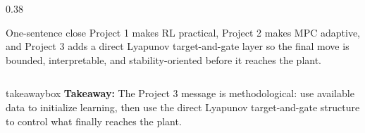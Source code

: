 \documentclass[aspectratio=169]{beamer}
\newcommand{\takeawaybox}[1]{%
\vspace{0.01cm}
\begin{center}
\begin{beamercolorbox}[wd=0.94\textwidth,sep=3pt,center,rounded=true,shadow=false]{takeawaybox}
\scriptsize
\textbf{\textcolor{maroon1}{Takeaway:}} #1
\end{beamercolorbox}
\end{center}
}
\begin{document}
\begin{frame}
\begin{columns}[T,onlytextwidth]
\begin{column}{0.38\textwidth}
\vspace{0.02cm}

\begin{block}{One-sentence close}
\justifying
Project 1 makes RL practical, Project 2 makes MPC adaptive, and Project 3 adds a direct Lyapunov target-and-gate layer so the final move is bounded, interpretable, and stability-oriented before it reaches the plant.
\end{block}
\end{column}

\end{columns}

\takeawaybox{The Project 3 message is methodological: use available data to initialize learning, then use the direct Lyapunov target-and-gate structure to control what finally reaches the plant.}

\end{frame}
\end{document}
